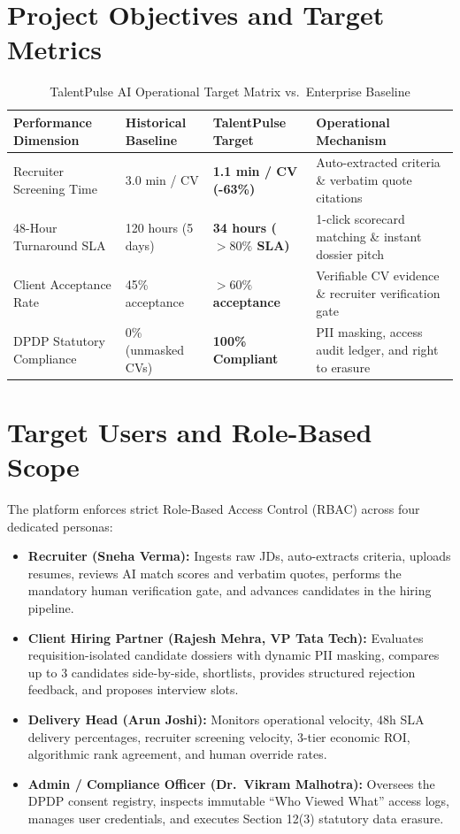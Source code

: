 \documentclass[11pt,a4paper,oneside]{report}
\begin{document}
\section{Project Objectives and Target Metrics}
\begin{table}[H]
\centering
\small
\renewcommand{\arraystretch}{1.2}
\begin{tabularx}{\textwidth}{@{} p{4.2cm} p{3.2cm} p{3.2cm} X @{}}
    \toprule
    \textbf{Performance Dimension} & \textbf{Historical Baseline} & \textbf{TalentPulse Target} & \textbf{Operational Mechanism} \\
    \midrule
    Recruiter Screening Time & 3.0 min / CV & \textbf{1.1 min / CV (-63\%)} & Auto-extracted criteria \& verbatim quote citations \\
    48-Hour Turnaround SLA & 120 hours (5 days) & \textbf{34 hours ($>80\%$ SLA)} & 1-click scorecard matching \& instant dossier pitch \\
    Client Acceptance Rate & 45\% acceptance & \textbf{$>60\%$ acceptance} & Verifiable CV evidence \& recruiter verification gate \\
    DPDP Statutory Compliance & 0\% (unmasked CVs) & \textbf{100\% Compliant} & PII masking, access audit ledger, and right to erasure \\
    \bottomrule
\end{tabularx}
\caption{TalentPulse AI Operational Target Matrix vs.\ Enterprise Baseline}
\end{table}

\section{Target Users and Role-Based Scope}
The platform enforces strict Role-Based Access Control (RBAC) across four dedicated personas:
\begin{itemize}[leftmargin=1.5em]
    \item \textbf{Recruiter (Sneha Verma):} Ingests raw JDs, auto-extracts criteria, uploads resumes, reviews AI match scores and verbatim quotes, performs the mandatory human verification gate, and advances candidates in the hiring pipeline.
    \item \textbf{Client Hiring Partner (Rajesh Mehra, VP Tata Tech):} Evaluates requisition-isolated candidate dossiers with dynamic PII masking, compares up to 3 candidates side-by-side, shortlists, provides structured rejection feedback, and proposes interview slots.
    \item \textbf{Delivery Head (Arun Joshi):} Monitors operational velocity, 48h SLA delivery percentages, recruiter screening velocity, 3-tier economic ROI, algorithmic rank agreement, and human override rates.
    \item \textbf{Admin / Compliance Officer (Dr.\ Vikram Malhotra):} Oversees the DPDP consent registry, inspects immutable ``Who Viewed What'' access logs, manages user credentials, and executes Section 12(3) statutory data erasure.
\end{itemize}
\end{document}
